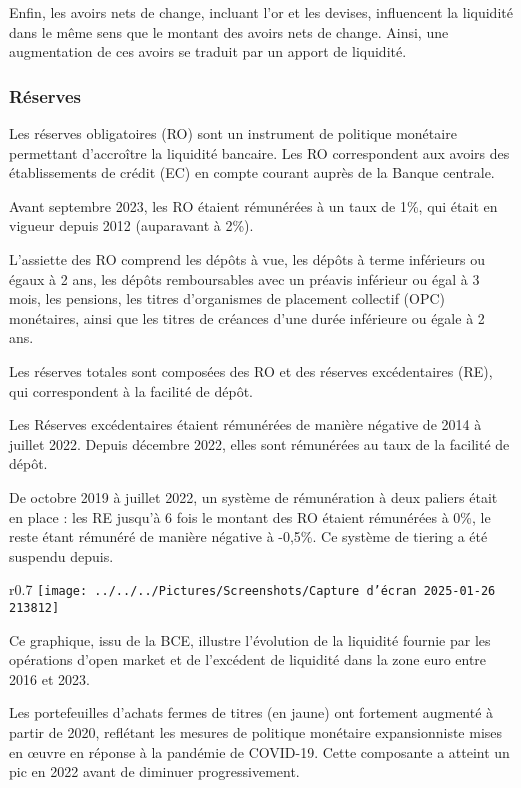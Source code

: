 \documentclass[a4paper, 12pt]{report}
\begin{document}
Enfin, les avoirs nets de change, incluant l'or et les devises, influencent la liquidité dans le même sens que le montant des avoirs nets de change. Ainsi, une augmentation de ces avoirs se traduit par un apport de liquidité.

\subsubsection{Réserves}

Les réserves obligatoires (RO) sont un instrument de politique monétaire permettant d'accroître la liquidité bancaire. Les RO correspondent aux avoirs des établissements de crédit (EC) en compte courant auprès de la Banque centrale.

Avant septembre 2023, les RO étaient rémunérées à un taux de 1\%, qui était en vigueur depuis 2012 (auparavant à 2\%).

L'assiette des RO comprend les dépôts à vue, les dépôts à terme inférieurs ou égaux à 2 ans, les dépôts remboursables avec un préavis inférieur ou égal à 3 mois, les pensions, les titres d'organismes de placement collectif (OPC) monétaires, ainsi que les titres de créances d'une durée inférieure ou égale à 2 ans.

Les réserves totales sont composées des RO et des réserves excédentaires (RE), qui correspondent à la facilité de dépôt.

Les Réserves excédentaires étaient rémunérées de manière négative de 2014 à juillet 2022. Depuis décembre 2022, elles sont rémunérées au taux de la facilité de dépôt.

De octobre 2019 à juillet 2022, un système de rémunération à deux paliers était en place : les RE jusqu'à 6 fois le montant des RO étaient rémunérées à 0\%, le reste étant rémunéré de manière négative à -0,5\%. Ce système de tiering a été suspendu depuis.

\begin{wrapfigure}{r}{0.7\textwidth}
	\centering
\texttt{[image: ../../../Pictures/Screenshots/Capture d'écran 2025-01-26 213812]}
\end{wrapfigure}
Ce graphique, issu de la BCE, illustre l'évolution de la liquidité fournie par les opérations d'open market et de l'excédent de liquidité dans la zone euro entre 2016 et 2023.  

Les portefeuilles d'achats fermes de titres (en jaune) ont fortement augmenté à partir de 2020, reflétant les mesures de politique monétaire expansionniste mises en œuvre en réponse à la pandémie de COVID-19. Cette composante a atteint un pic en 2022 avant de diminuer progressivement.  
\end{document}
